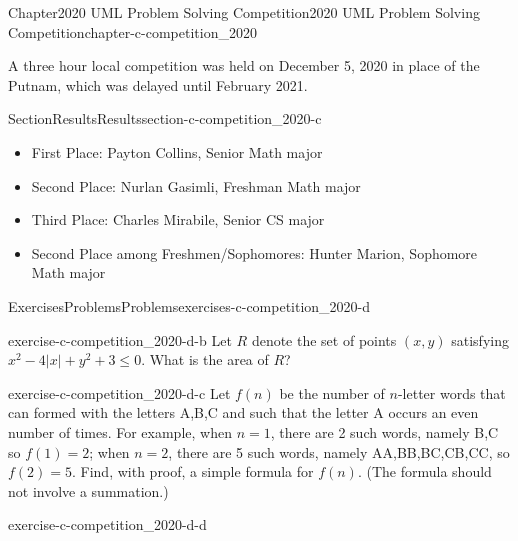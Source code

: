 \documentclass[oneside,10pt,]{book}
\numberwithin{equation}{section}
\begin{document}
\begin{chapterptx}{Chapter}{2020 UML Problem Solving Competition}{}{2020 UML Problem Solving Competition}{}{}{chapter-c-competition_2020}
\renewcommand*{\chaptername}{Chapter}
\begin{introduction}{}%
A three hour local competition was held on December 5, 2020 in place of the Putnam, which was delayed until February 2021.%
\end{introduction}%
%
%
\typeout{************************************************}
\typeout{************************************************}
%
\begin{sectionptx}{Section}{Results}{}{Results}{}{}{section-c-competition_2020-c}
%
\begin{itemize}[label=\textbullet]
\item{}First Place:  Payton Collins, Senior Math major%
\item{}Second Place: Nurlan Gasimli, Freshman Math major%
\item{}Third Place: Charles Mirabile, Senior CS major%
\item{}Second Place among Freshmen\slash{}Sophomores:  Hunter Marion, Sophomore Math major%
\end{itemize}
%
\end{sectionptx}
%
%
\typeout{************************************************}
\typeout{************************************************}
%
\begin{exercises-section}{Exercises}{Problems}{}{Problems}{}{}{exercises-c-competition_2020-d}
\begin{divisionexercise}{1}{}{}{exercise-c-competition_2020-d-b}%
Let \(R\) denote the set of points \((x, y)\) satisfying \(x^2 - 4 \lvert x \rvert +y^2 + 3 \leq 0\). What is the area of \(R\)?%
\end{divisionexercise}%
\begin{divisionexercise}{2}{}{}{exercise-c-competition_2020-d-c}%
Let \(f(n)\) be the number of \(n\)-letter words that can formed with the letters A,B,C and such that the letter A occurs an even number of times. For example, when \(n = 1\), there are 2 such words, namely B,C so \(f (1) = 2\); when \(n = 2\), there are 5 such words, namely AA,BB,BC,CB,CC, so \(f(2) = 5\). Find, with proof, a simple formula for \(f(n)\). (The formula should not involve a summation.)%
\end{divisionexercise}%
\begin{divisionexercise}{3}{}{}{exercise-c-competition_2020-d-d}%

\end{divisionexercise}
\end{exercises-section}
\end{chapterptx}
\end{document}
